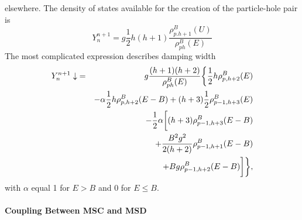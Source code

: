 elsewhere. The density of states available for the creation of the
particle-hole pair is 
\begin{equation}
Y_{n}^{n+1}=g\frac{1}{2}h(h+1)\frac{\rho_{p.h+1}^{B}(U)}{\rho_{ph}^{B}(E)}
\label{Yplus}
\end{equation}
The most complicated expression describes damping width 
\begin{eqnarray}
Y_{n}^{n+1}\downarrow & = & g\frac{(h+1)(h+2)}{\rho_{ph}^{B}(E)}\biggl\{%
\frac{1}{2}h\rho_{p,h+2}^{B}(E)  \notag \\
&&-\alpha\frac{1}{2}h\rho_{p,h+2}^{B}(E-B)+(h+3)\frac{1}{2}%
\rho_{p-1,h+3}^{B}(E)  \notag \\
& & -\frac{1}{2}\alpha\biggl[(h+3)\rho_{p-1,h+3}^{B}(E-B)  \notag
\label{Ydown} \\
& & +\frac{B^{2}g^{2}}{2(h+2)}\rho_{p-1,h+1}^{B}(E-B)  \notag \\
&& +Bg\rho_{p-1,h+2}^{B}(E-B)\biggr]\biggr\},
\end{eqnarray}
\noindent with $\alpha$ equal 1 for $E>B$ and 0 for $E\leq B$.

\medskip

\paragraph{Coupling Between MSC%
 and MSD%
}

